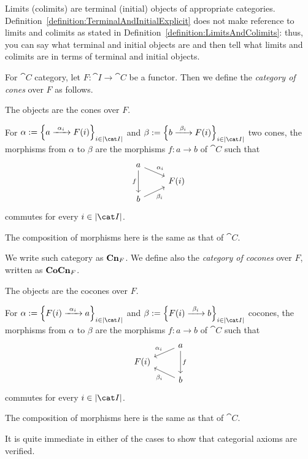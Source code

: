 Limits (colimits) are terminal (initial) objects of appropriate
categories. Definition~\ref{definition:TerminalAndInitialExplicit}
does not make reference to limits and colimits as stated in
Definition~\ref{definition:LimitsAndColimits}: thus, you can say what
terminal and initial objects are and then tell what limits and
colimits are in terms of terminal and initial objects.

\begin{construction}
  For \(\cat C\) category, let \(F : \cat I \to \cat C\) be a
  functor. Then we define the {\em category of cones} over \(F\) as
  follows.
  \begin{tcbitem}
  \item The objects are the cones over \(F\).
  \item For
    \(\alpha := \set{a \functo{\alpha_i} F(i)}_{i \in \obj{\cat I}}\) and
    \(\beta := \set{b \functo{\beta_i} F(i)}_{i \in \obj{\cat I}}\) two cones,
    the morphisms from \(\alpha\) to \(\beta\) are the morphisms
    \(f : a \to b\) of \(\cat C\) such that
    \[\begin{tikzcd}[row sep=tiny]
        a \ar["{\alpha_i}", dr] \ar["f", dd, swap] \\
        & F(i) \\
        b \ar["{\beta_i}", ur, swap]
      \end{tikzcd}\] commutes for every \(i \in \obj{\cat I}\).
  \item The composition of morphisms here is the same as that of
    \(\cat C\).
  \end{tcbitem}
  We write such category as \(\mathbf{Cn}_F\). We define also the {\em
    category of cocones} over \(F\), written as \(\mathbf{CoCn}_F\).
  \begin{tcbitem}
  \item The objects are the cocones over \(F\).
  \item For
    \(\alpha := \set{F(i) \functo{\alpha_i} a}_{i \in \obj{\cat I}}\) and
    \(\beta := \set{F(i) \functo{\beta_i} b}_{i \in \obj{\cat I}}\) cocones, the
    morphisms from \(\alpha\) to \(\beta\) are the morphisms
    \(f : a \to b\) of \(\cat C\) such that
    \[\begin{tikzcd}[row sep=tiny]
        & a \ar["{\alpha_i}", dl, swap] \ar["f", dd] \\
        F(i) \\
        & b \ar["{\beta_i}", ul]
      \end{tikzcd}\] commutes for every \(i \in \obj{\cat I}\).
  \item The composition of morphisms here is the same as that of
    \(\cat C\).
  \end{tcbitem}
  It is quite immediate in either of the cases to show that categorial
  axioms are verified.
\end{construction}

